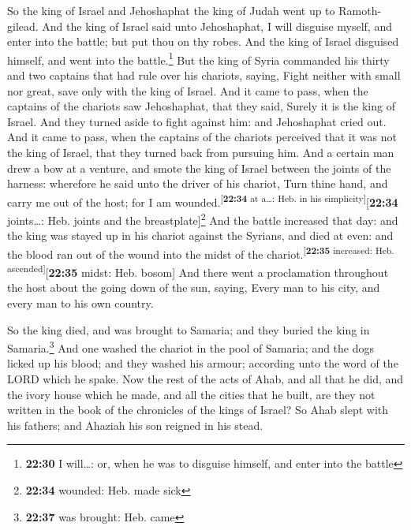  So the king of Israel and Jehoshaphat the king of Judah
went up to Ramoth-gilead.  And the king of Israel said
unto Jehoshaphat, I will disguise myself, and enter into the battle; but
put thou on thy robes. And the king of Israel disguised himself, and
went into the battle.\footnote{\textbf{22:30} I will\ldots: or, when he
  was to disguise himself, and enter into the battle} 
But the king of Syria commanded his thirty and two captains that had
rule over his chariots, saying, Fight neither with small nor great, save
only with the king of Israel.  And it came to pass, when
the captains of the chariots saw Jehoshaphat, that they said, Surely it
is the king of Israel. And they turned aside to fight against him: and
Jehoshaphat cried out.  And it came to pass, when the
captains of the chariots perceived that it was not the king of Israel,
that they turned back from pursuing him.  And a certain
man drew a bow at a venture, and smote the king of Israel between the
joints of the harness: wherefore he said unto the driver of his chariot,
Turn thine hand, and carry me out of the host; for I am
wounded.\textsuperscript{{[}\textbf{22:34} at a\ldots: Heb. in his
simplicity{]}}{[}\textbf{22:34} joints\ldots: Heb. joints and the
breastplate{]}\footnote{\textbf{22:34} wounded: Heb. made sick}
 And the battle increased that day: and the king was
stayed up in his chariot against the Syrians, and died at even: and the
blood ran out of the wound into the midst of the
chariot.\textsuperscript{{[}\textbf{22:35} increased: Heb.
ascended{]}}{[}\textbf{22:35} midst: Heb. bosom{]}  And
there went a proclamation throughout the host about the going down of
the sun, saying, Every man to his city, and every man to his own
country.

 So the king died, and was brought to Samaria; and they
buried the king in Samaria.\footnote{\textbf{22:37} was brought: Heb.
  came}  And one washed the chariot in the pool of
Samaria; and the dogs licked up his blood; and they washed his armour;
according unto the word of the LORD which he spake.  Now
the rest of the acts of Ahab, and all that he did, and the ivory house
which he made, and all the cities that he built, are they not written in
the book of the chronicles of the kings of Israel?  So
Ahab slept with his fathers; and Ahaziah his son reigned in his stead.

